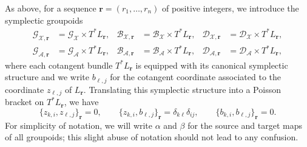 \documentclass{amsart}
\numberwithin{equation}{section}
\newcommand{\bfr}{{\boldsymbol{r}}}
\newcommand{\cA}{\mathcal{A}}
\newcommand{\cB}{\mathcal{B}}
\newcommand{\cD}{\mathcal{D}}
\newcommand{\cG}{\mathcal{G}}
\newcommand{\cX}{\mathcal{X}}
\begin{document}
As above, for a sequence $\bfr=(r_1,\ldots,r_n)$ of positive integers, we introduce the symplectic groupoids 
\begin{align*}
  \cG_{\cX,\bfr}&=\cG_\cX\times T^*L_\bfr,& \cB_{\cX,\bfr}&=\cB_\cX\times T^*L_\bfr,& \cD_{\cX,\bfr}&=\cD_\cX\times T^*L_\bfr,\\
  \cG_{\cA,\bfr}&=\cG_\cA\times T^*L_\bfr,& \cB_{\cA,\bfr}&=\cB_\cA\times T^*L_\bfr,& \cD_{\cA,\bfr}&=\cD_\cA\times T^*L_\bfr,
\end{align*}
where each cotangent bundle $T^*L_\bfr$ is equipped with its canonical symplectic structure and we write $b_{\ell,j}$ for the cotangent coordinate associated to the coordinate $z_{\ell,j}$ of $L_\bfr$.
Translating this symplectic structure into a Poisson bracket on $T^*L_\bfr$, we have
\begin{equation}
  \label{eq:canonical brackets}
  \{z_{k,i},z_{\ell,j}\}_\bfr=0,\qquad\{z_{k,i},b_{\ell,j}\}_\bfr=\delta_{k\ell}\delta_{ij},\qquad\{b_{k,i},b_{\ell,j}\}_\bfr=0.
\end{equation}
For simplicity of notation, we will write $\alpha$ and $\beta$ for the source and target maps of all groupoids; this slight abuse of notation should not lead to any confusion.
\end{document}
